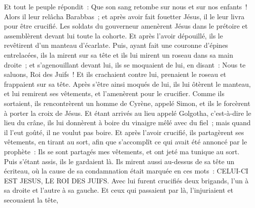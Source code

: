 \begin{multicols}{2}
Et tout le peuple répondit~: Que son sang retombe sur nous et sur nos enfants~!
Alors il leur relâcha Barabbas~; et après avoir fait fouetter Jésus, il le leur livra pour être crucifié.
Les soldats du gouverneur amenèrent Jésus dans le prétoire et assemblèrent devant lui toute la cohorte.
Et après l'avoir dépouillé, ils le revêtirent d'un manteau d'écarlate.
Puis, ayant fait une couronne d'épines entrelacées, ils la mirent sur sa tête et ils lui mirent un roseau dans sa main droite~; et s'agenouillant devant lui, ils se moquaient de lui, en disant~: Nous te saluons, Roi des Juifs~!
Et ils crachaient contre lui, prenaient le roseau et frappaient sur sa tête.
Après s'être ainsi moqués de lui, ils lui ôtèrent le manteau, et lui remirent ses vêtements, et l'amenèrent pour le crucifier.
Comme ils sortaient, ils rencontrèrent un homme de Cyrène, appelé Simon, et ils le forcèrent à porter la croix de Jésus.
Et étant arrivés au lieu appelé Golgotha, c'est-à-dire le lieu du crâne,
ils lui donnèrent à boire du vinaigre mêlé avec du fiel~; mais quand il l'eut goûté, il ne voulut pas boire.
Et après l'avoir crucifié, ils partagèrent ses vêtements, en tirant au sort, afin que s'accomplît ce qui avait été annoncé par le prophète~: Ils se sont partagés mes vêtements, et ont jeté ma tunique au sort.
Puis s'étant assis, ils le gardaient là.
Ils mirent aussi au-dessus de sa tête un écriteau, où la cause de sa condamnation était marquée en ces mots~: CELUI-CI EST JESUS, LE ROI DES JUIFS.
Avec lui furent crucifiés deux brigands, l'un à sa droite et l'autre à sa gauche.
Et ceux qui passaient par là, l'injuriaient et secouaient la tête,

\end{multicols}
